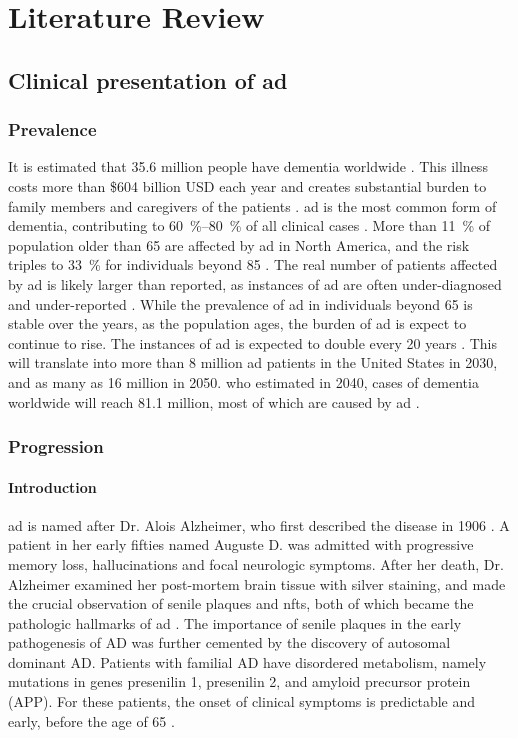 \chapter{Literature Review}

\section{Clinical presentation of \gls{ad}}
\subsection{Prevalence}
It is estimated that 35.6 million people have dementia worldwide \citep{who13}. This illness costs more than \$604 billion USD each year and creates substantial burden to family members and caregivers of the patients \citep{who13}. \gls{ad} is the most common form of dementia, contributing to \SIrange{60}{80}{\percent}  of all clinical cases \citep{ad16}. More than \SI{11}{\percent} of population older than 65 are affected by \gls{ad} in North America, and the risk triples to \SI{33}{\percent} for individuals beyond 85 \citep{hebert13}. The real number of patients affected by \gls{ad} is likely larger than reported, as instances of \gls{ad} are often under-diagnosed and under-reported \citep{barrett06, zaleta12}. While the prevalence of \gls{ad} in individuals beyond 65 is stable over the years, as the population ages, the burden of \gls{ad} is expect to continue to rise. The instances of \gls{ad} is expected to double every 20 years \citep{who13, hebert13}. This will translate into more than 8 million \gls{ad} patients in the United States in 2030, and as many as 16 million in 2050. \Gls{who} estimated in 2040, cases of dementia worldwide will reach 81.1 million, most of which are caused by \gls{ad} \citep{who13}. 

\subsection{Progression}
\subsubsection{Introduction}

\gls{ad} is named after Dr. Alois Alzheimer, who first described the disease in 1906 \citep{goedert06}. A patient in her early fifties named Auguste D. was admitted with progressive memory loss, hallucinations and focal neurologic symptoms. After her death, Dr. Alzheimer examined her post-mortem brain tissue with silver staining, and made the crucial observation of senile plaques and \glspl{nft}, both of which became the pathologic hallmarks of \gls{ad} \citep{goedert06, dubois16}. The importance of senile plaques in the early pathogenesis of AD was further cemented by the discovery of autosomal dominant AD. Patients with familial AD have disordered \abeta{} metabolism, namely mutations in genes presenilin 1, presenilin 2, and amyloid precursor protein (APP). For these patients, the onset of clinical symptoms is predictable and early, before the age of 65 \citep{goedert06, dubois16}.

